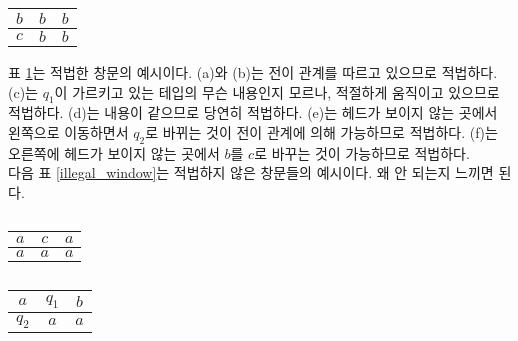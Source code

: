 \documentclass[b5paper, 11pt]{book}
\theoremstyle{definition}
\newenvironment{pf*}{\pushQED{\qed}\pf}
{\popQED\endpf}
\begin{document}
\begin{pf*}
\begin{table}[!ht]
        \hfill
        \begin{subtable}[h]{0.3\textwidth}
            \centering
            \begin{tabular}{ | c | c | c|}
            \hline 
            $b$ & $b$ & $b$ \\ 
            \hline 
            $c$ & $b$ & $b$ \\ 
            \hline
           \end{tabular}
           \caption{}
        \end{subtable}
         \caption{}
         \label{legal_window}
    \end{table}
    표 \ref{legal_window}는 적법한 창문의 예시이다. (a)와 (b)는 전이 관계를 따르고 있으므로 적법하다. (c)는 $q_1$이 가르키고 있는 테입의 무슨 내용인지 모르나, 적절하게 움직이고 있으므로 적법하다. (d)는 내용이 같으므로 당연히 적법하다. (e)는 헤드가 보이지 않는 곳에서 왼쪽으로 이동하면서 $q_2$로 바뀌는 것이 전이 관계에 의해 가능하므로 적법하다. (f)는 오른쪽에 헤드가 보이지 않는 곳에서 $b$를 $c$로 바꾸는 것이 가능하므로 적법하다. \\ 
    다음 표 \ref{illegal_window}는 적법하지 않은 창문들의 예시이다. 왜 안 되는지 느끼면 된다.
    \begin{table}[!ht]
        \begin{subtable}[h]{0.3\textwidth}
            \centering
            \begin{tabular}{ | c | c | c|}
            \hline 
            $a$ & $c$ & $a$ \\ 
            \hline 
            $a$ & $a$ & $a$ \\ 
            \hline
           \end{tabular}
           \caption{}
        \end{subtable}
        \hfill
        \begin{subtable}[h]{0.3\textwidth}
            \centering
            \begin{tabular}{ | c | c | c|}
            \hline 
            $a$ & $q_1$ & $b$ \\ 
            \hline 
            $q_2$ & $a$ & $a$ \\ 
            \hline
           \end{tabular}
           \caption{}
        \end{subtable}
        \hfill
        \begin{subtable}[h]{0.3\textwidth}
            \centering
            \begin{tabular}{ | c | c | c|}

\end{tabular}
\end{subtable}
\end{table}
\end{pf*}
\end{document}
